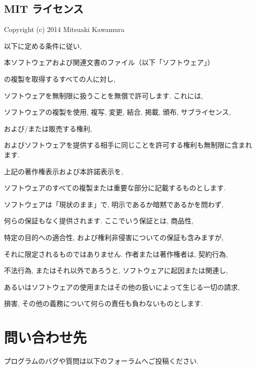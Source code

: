 \documentclass[letterpaper,10pt,dvipdfmx,openany]{sphinxmanual}
\begin{document}
\section{MIT ライセンス}
\label{\detokenize{copy:mit}}\label{\detokenize{copy:mitlicense}}
\begin{DUlineblock}{0em}
\item[] Copyright (c) 2014 Mitsuaki Kawamura
\item[] 
\item[] 以下に定める条件に従い,
\item[] 本ソフトウェアおよび関連文書のファイル（以下「ソフトウェア」）
\item[] の複製を取得するすべての人に対し,
\item[] ソフトウェアを無制限に扱うことを無償で許可します. これには,
\item[] ソフトウェアの複製を使用, 複写, 変更, 結合, 掲載, 頒布, サブライセンス,
\item[] および/または販売する権利,
\item[] およびソフトウェアを提供する相手に同じことを許可する権利も無制限に含まれます.
\item[] 
\item[] 上記の著作権表示および本許諾表示を,
\item[] ソフトウェアのすべての複製または重要な部分に記載するものとします.
\item[] 
\item[] ソフトウェアは「現状のまま」で, 明示であるか暗黙であるかを問わず,
\item[] 何らの保証もなく提供されます. ここでいう保証とは, 商品性,
\item[] 特定の目的への適合性, および権利非侵害についての保証も含みますが,
\item[] それに限定されるものではありません. 作者または著作権者は, 契約行為,
\item[] 不法行為, またはそれ以外であろうと, ソフトウェアに起因または関連し,
\item[] あるいはソフトウェアの使用またはその他の扱いによって生じる一切の請求,
\item[] 損害, その他の義務について何らの責任も負わないものとします.
\end{DUlineblock}

\sphinxstepscope


\chapter{問い合わせ先}
\label{\detokenize{contact:id1}}\label{\detokenize{contact::doc}}
\sphinxAtStartPar
プログラムのバグや質問は以下のフォーラムへご投稿ください.
\begin{quote}

\sphinxAtStartPar
{}
\end{quote}
\end{document}
